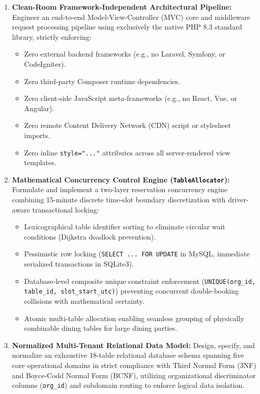 \begin{enumerate}[label=\textbf{TO\arabic*.}]
    \item \textbf{Clean-Room Framework-Independent Architectural Pipeline:} Engineer an end-to-end Model-View-Controller (MVC) core and middleware request processing pipeline using exclusively the native PHP 8.3 standard library, strictly enforcing:
    \begin{itemize}
        \item Zero external backend frameworks (e.g., no Laravel, Symfony, or CodeIgniter).
        \item Zero third-party Composer runtime dependencies.
        \item Zero client-side JavaScript meta-frameworks (e.g., no React, Vue, or Angular).
        \item Zero remote Content Delivery Network (CDN) script or stylesheet imports.
        \item Zero inline \texttt{style="..."} attributes across all server-rendered view templates.
    \end{itemize}
    \item \textbf{Mathematical Concurrency Control Engine (\texttt{TableAllocator}):} Formulate and implement a two-layer reservation concurrency engine combining 15-minute discrete time-slot boundary discretization with driver-aware transactional locking:
    \begin{itemize}
        \item Lexicographical table identifier sorting to eliminate circular wait conditions (Dijkstra deadlock prevention).
        \item Pessimistic row locking (\texttt{SELECT ... FOR UPDATE} in MySQL, immediate serialized transactions in SQLite3).
        \item Database-level composite unique constraint enforcement (\texttt{UNIQUE(org\_id, table\_id, slot\_start\_utc)}) preventing concurrent double-booking collisions with mathematical certainty.
        \item Atomic multi-table allocation enabling seamless grouping of physically combinable dining tables for large dining parties.
    \end{itemize}
    \item \textbf{Normalized Multi-Tenant Relational Data Model:} Design, specify, and normalize an exhaustive 18-table relational database schema spanning five core operational domains in strict compliance with Third Normal Form (3NF) and Boyce-Codd Normal Form (BCNF), utilizing organizational discriminator columns (\texttt{org\_id}) and subdomain routing to enforce logical data isolation.

\end{enumerate}
